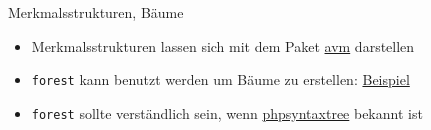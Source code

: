 \begin{frame}[fragile]{Merkmalsstrukturen, Bäume}
    \begin{itemize}[<+->]
        \item Merkmalsstrukturen lassen sich mit dem Paket \href{http://www.essex.ac.uk/linguistics/external/clmt/latex4ling/avms/}{avm} darstellen
        \item \texttt{forest} kann benutzt werden um Bäume zu erstellen: \href{https://www.overleaf.com/3419620fkxwhd#/9651961/}{Beispiel}
        \item \texttt{forest} sollte verständlich sein, wenn \href{http://ironcreek.net/phpsyntaxtree/}{phpsyntaxtree} bekannt ist
    \end{itemize}
\end{frame}
